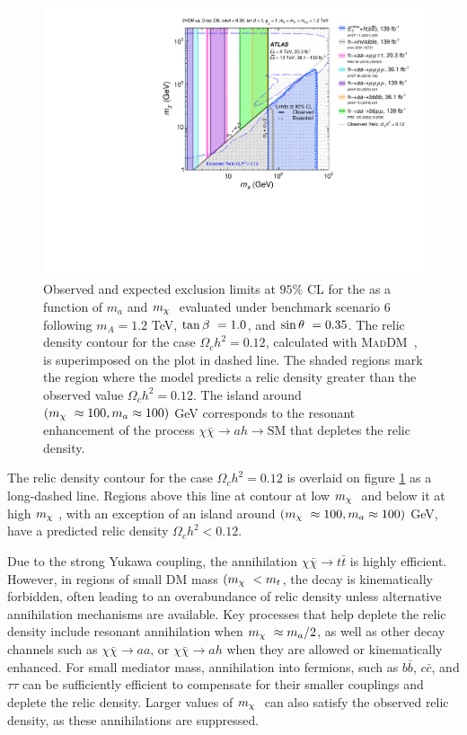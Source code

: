\begin{figure}[h!]
    \centering
    \includegraphics[width=0.6\linewidth]{figures/fig_09.pdf}
    \caption{Observed and expected exclusion limits at $95\%$ CL for the \thdma as a function of $m_a$ and $m_{\chi}~$ evaluated under benchmark scenario 6 following $m_A=1.2$ TeV, $\tan\beta~=1.0$, and $\sin\theta~=0.35$. The relic density contour for the case $\Omega_ch^2=0.12$, calculated with \textsc{MadDM}~\cite{Ambrogi:2018jqj}, is superimposed on the plot in dashed line. The shaded regions mark the region where the model predicts a relic density greater than the observed value $\Omega_ch^2=0.12$. The island around $(m_{\chi}~\approx100, m_a\approx 100)$ GeV corresponds to the resonant enhancement of the process $\chi\bar{\chi} \rightarrow ah \rightarrow \mathrm{SM}$ that depletes the relic density. }
    \label{fig:result-ma-mX-scan}
\end{figure} 

The relic density contour for the case $\Omega_ch^2=0.12$ is overlaid on figure \ref{fig:result-ma-mX-scan} as a long-dashed line. Regions above this line at contour at low $m_{\chi}~$ and below it at high $m_{\chi}~$, with an exception of an island around $(m_{\chi}~\approx100, m_a\approx 100)$ GeV, have a predicted relic density $\Omega_ch^2 < 0.12$. 

Due to the strong Yukawa coupling, the annihilation $\chi\bar{\chi}\rightarrow t\bar{t}$ is highly efficient. However, in regions of small DM mass $(m_{\chi}~ < m_t$, the decay is kinematically forbidden, often leading to an overabundance of relic density unless alternative annihilation mechanisms are available. Key processes that help deplete the relic density include resonant annihilation when $m_{\chi}~\approx m_a/2$, as well as other decay channels such as $\chi\bar{\chi}\rightarrow aa$, or $\chi\bar{\chi}\rightarrow ah$ when they are allowed or kinematically enhanced. For small mediator mass, annihilation into fermions, such as $b\bar{b}$, $c\bar{c}$, and $\tau\tau$ can be sufficiently efficient to compensate for their smaller couplings and deplete the relic density. Larger values of $m_{\chi}~$ can also satisfy the observed relic density, as these annihilations are suppressed. 

